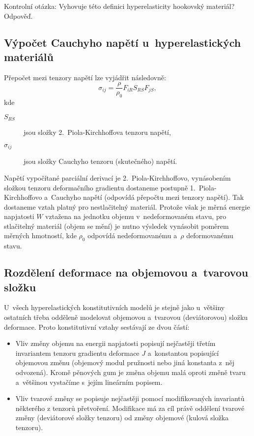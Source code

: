 Kontrolní otázka: Vyhovuje této definici hyperelasticity hookovský materiál? Odpověď.

\subsection{Výpočet Cauchyho napětí u~hyperelastických materiálů}
Přepočet mezi tenzory napětí lze vyjádřit následovně:
\begin{equation}\label{key}
\sigma_{ij} = \frac{\rho}{\rho_0} F_{iR} S_{RS} F_{jS},
\end{equation}
kde
\begin{description}
	\item[$S_{RS}$] jsou složky 2.~Piola-Kirchhoffova tenzoru napětí,
	\item[$\sigma_{ij}$] jsou složky Cauchyho tenzoru (skutečného) napětí.
\end{description}

Napětí vypočítané parciální derivací je 2.~Piola-Kirchhoffovo, vynásobením  složkou tenzoru deformačního gradientu dostaneme postupně 1.~Piola-Kirchhoffovo a~Cauchyho napětí (odpovídá přepočtu mezi tenzory napětí).
Tak dostaneme vztah platný pro nestlačitelný materiál.
Protože však je měrná energie napjatosti $W$ vztažena na jednotku objemu v~nedeformovaném stavu, pro stlačitelný materiál (objem se mění) je nutno výsledek vynásobit poměrem měrných hmotností, kde $\rho_0$ odpovídá nedeformovanému a~$\rho$ deformovanému stavu.

\subsection{Rozdělení deformace na objemovou a~tvarovou složku}
U~všech hyperelastických konstitutivních modelů je stejně jako u~většiny ostatních třeba odděleně modelovat objemovou a~tvarovou (deviátorovou) složku deformace.
Proto konstitutivní vztahy sestávají ze dvou částí:
\begin{itemize}
	\item Vliv změny objemu na energii napjatosti popisují nejčastěji třetím invariantem tenzoru gradientu deformace $J$ a~konstantou popisující objemovou změnu (objemový modul pružnosti nebo jiná konstanta z~něj odvozená). Kromě pěnových gum je změna objemu malá oproti změně tvaru a~většinou vystačíme s~jejím lineárním popisem.
	\item Vliv tvarové změny se popisuje nejčastěji pomocí modifikovaných invariantů některého z tenzorů přetvoření. Modifikace má za cíl právě oddělení tvarové změny (deviátorové složky tenzoru) od změny objemové (kulová složka tenzoru).
\end{itemize}

